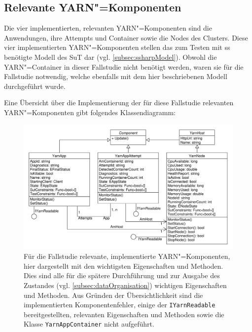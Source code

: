 \subsection{Relevante YARN"=Komponenten}
\label{subsec:yarnComponents}

Die vier implementierten, relevanten YARN"=Komponenten sind die Anwendungen, ihre Attempts und Container sowie die Nodes des Clusters.
Diese vier implementierten YARN"=Komponenten stellen das zum Testen mit \gls{ss} benötigte Modell des \gls{SuT} dar (vgl. \cref{subsec:ssharpModel}).
Obwohl die YARN"=Container in dieser Fallstudie nicht benötigt werden, waren sie für die Fallstudie \cite{Eberhardinger2018} notwendig, welche ebenfalls mit dem hier beschriebenen Modell durchgeführt wurde.

Eine Übersicht über die Implementierung der für diese Fallstudie relevanten YARN"=Komponenten gibt folgendes Klassendiagramm:

\begin{figure}[h]
    \includegraphics[width=\columnwidth]{./resources/yarnComponents.pdf}
    \caption[Für die Fallstudie relevante, implementierte YARN"=Komponenten]
        {Für die Fallstudie relevante, implementierte YARN"=Komponenten, hier dargestellt mit den wichtigsten Eigenschaften und Methoden.
        Dies sind alle für die spätere Durchführung und zur Ausgabe des Zustandes (vgl. \cref{subsec:dataOrganisation}) wichtigen Eigenschaften und Methoden.
        Aus Gründen der Übersichtlichkeit sind die implementierten Komponentenfehler, einige der \texttt{IYarnReadable} bereitgestellten, relevanten Eigenschaften und Methoden sowie die Klasse \texttt{YarnAppContainer} nicht aufgeführt.}
    \label{fig:yarnComponentsClassDiagram}
\end{figure}

